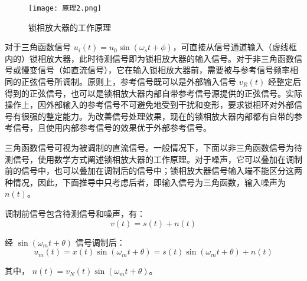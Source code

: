 \documentclass[dvipsnames, svgnames,a4paper,11pt]{article}
\begin{document}
\begin{figure}[{H}]
	\centering
	\texttt{[image: 原理2.png]}
	\caption{锁相放大器的工作原理}
	\label{}
\end{figure}


对于三角函数信号 \(u_i(t) = u_0 \sin (\omega_s t + \phi)\)，可直接从信号通道输入（虚线框内的）锁相放大器，此时待测信号即为锁相放大器的输入信号。对于非三角函数信号或慢变信号（如直流信号），它在输入锁相放大器前，需要被与参考信号频率相同的正弦信号所调制。原则上，参考信号既可以是外部输入信号 \(v_R(t)\) 经整定后得到的正弦信号，也可以是锁相放大器内部自带参考信号源提供的正弦信号。实际操作上，因外部输入的参考信号不可避免地受到干扰和变形，要求锁相环对外部信号有很强的整定能力。为改善信号处理效果，现在的锁相放大器内部都有自带的参考信号，且使用内部参考信号的效果优于外部参考信号。

三角函数信号可视为被调制的直流信号。一般情况下，下面以非三角函数信号为待测信号，使用数学方式阐述锁相放大器的工作原理。对于噪声，它可以叠加在调制前的信号中，也可以叠加在调制后的信号中；锁相放大器信号输入端不能区分这两种情况，因此，下面推导中只考虑后者，即输入信号为三角函数，输入噪声为 \(n(t)\)。

调制前信号包含待测信号和噪声，有：
\begin{equation}
    v(t) = s(t) + n(t)
\end{equation}

经 \(\sin (\omega_m t + \theta)\) 信号调制后：
\begin{equation}
    u_m(t) = x(t) \sin (\omega_m t + \theta) = s(t) \sin (\omega_m t + \theta) + n(t)
\end{equation}

其中， \(n(t) = v_N(t) \sin (\omega_m t + \theta)\)。
\end{document}
